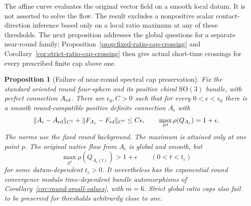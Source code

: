 \documentclass[11pt]{article}
\numberwithin{equation}{section}
\newtheorem{proposition}[theorem]{Proposition}
\theoremstyle{definition}
\theoremstyle{remark}
\begin{document}
The affine curve evaluates the original vector field on a
smooth local datum. It is not asserted to solve the flow.
The result excludes a nonpositive scalar contact-direction
inference based only on a local ratio maximum at any of
these thresholds. The next proposition addresses the global questions
for a separate near-round family; Proposition~\ref{prop:fixed-ratio-cap-crossing}
and Corollary~\ref{cor:strict-ratio-cap-crossing} then give actual short-time
crossings for every prescribed finite cap above one.


\begin{proposition}[Failure of near-round spectral cap preservation]
\label{prop:global-ratio-cap-crossing}
Fix the standard oriented round four-sphere and its positive
chiral $\mathrm{SO}(3)$ bundle, with perfect connection
$A_{\rm rd}$. There are $\epsilon_0,C>0$ such that for every
$0<\epsilon<\epsilon_0$ there is a smooth round-compatible
positive definite connection $A_\epsilon$ with
\[
 \|A_\epsilon-A_{\rm rd}\|_{C^1}
       +\|F_{A_\epsilon}-F_{\rm rd}\|_{C^0}\le C\epsilon,
 \qquad \max_{S^4}\rho(Q_{A_\epsilon})=1+\epsilon.
\]
The norms use the fixed round background. The maximum is
attained only at one point $p$. The original native flow from
$A_\epsilon$ is global and smooth, but
\[
 \max_{S^4}\rho(Q_{A_\epsilon(t)})>1+\epsilon
                 \qquad(0<t<t_\epsilon)
\]
for some datum-dependent $t_\epsilon>0$. It nevertheless has
the exponential round convergence modulo time-dependent
bundle automorphisms of Corollary~\ref{cor:round-small-values},
with $m=6$. Strict global ratio caps also fail to be preserved
for thresholds arbitrarily close to one.
\end{proposition}
\end{document}
